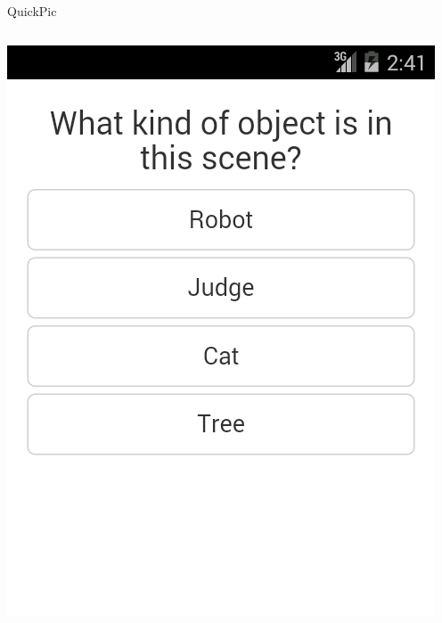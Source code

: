 \documentclass[aspectratio=169]{beamer}
\begin{document}
\begin{frame}{QuickPic}
\begin{columns}[c]
\begin{column}{0.5\columnwidth}
      \includegraphics[width=\textwidth,height=\textheight,keepaspectratio]{ss_quickpic_options}
    \end{column}
  \end{columns}
\end{frame}

\end{document}
